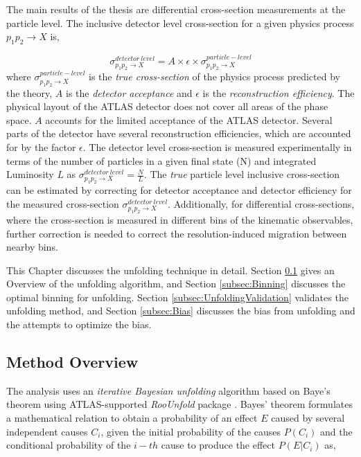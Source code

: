 The main results of the thesis are differential cross-section measurements at the particle level. The inclusive detector level cross-section for a given physics process $p_{1}p_{2}\rightarrow X$ is, 

\begin{equation}
    \sigma ^{detector~level}_{p_{1}p_{2}\rightarrow X} = A \times \epsilon \times \sigma ^{particle-level}_{p_{1}p_{2}\rightarrow X}
    \label{eqn:InclusiveXS}
\end{equation}
where $\sigma ^{particle-level}_{p_{1}p_{2}\rightarrow X}$ is the \textit{true cross-section} of the physics process predicted by the theory, $A$ is the \textit{detector acceptance} and $\epsilon$ is the \textit{reconstruction efficiency}. The physical layout of the ATLAS detector does not cover all areas of the phase space. $A$ accounts for the limited acceptance of the ATLAS detector. Several parts of the detector have several reconstruction efficiencies, which are accounted for by the factor $\epsilon$. The detector level cross-section is measured experimentally in terms of the number of particles in a given final state (N) and integrated Luminosity $L$ as $\sigma ^{detector~level}_{p_{1}p_{2}\rightarrow X} = \frac{N}{L}$. The \textit{true} particle level inclusive cross-section can be estimated by correcting for detector acceptance and detector efficiency for the measured cross-section $\sigma ^{detector~level}_{p_{1}p_{2}\rightarrow X}$. Additionally, for differential cross-sections, where the cross-section is measured in different bins of the kinematic observables, further correction is needed to correct the resolution-induced migration between nearby bins. 

This Chapter discusses the unfolding technique in detail. Section \ref{subsec:UnfoldingOverview} gives an Overview of the unfolding algorithm, and Section \ref{subsec:Binning} discusses the optimal binning for unfolding. Section \ref{subsec:UnfoldingValidation} validates the unfolding method, and Section \ref{subsec:Bias} discusses the bias from unfolding and the attempts to optimize the bias. 

\subsection{Method Overview}
\label{subsec:UnfoldingOverview}
The analysis uses an \textit{iterative Bayesian unfolding} algorithm based on Baye's theorem \cite{BayesianUnfolding} \cite{Improved_BayesianUnfolding} using ATLAS-supported \textit{RooUnfold} package \cite{RooUnfold}. Bayes' theorem formulates a mathematical relation to obtain a probability of an effect $E$ caused by several independent causes $C_{i}$, given the initial probability of the causes $P(C_{i})$ and the conditional probability of the $i-th$ cause to produce the effect $P(E|C_{i})$ as, 


